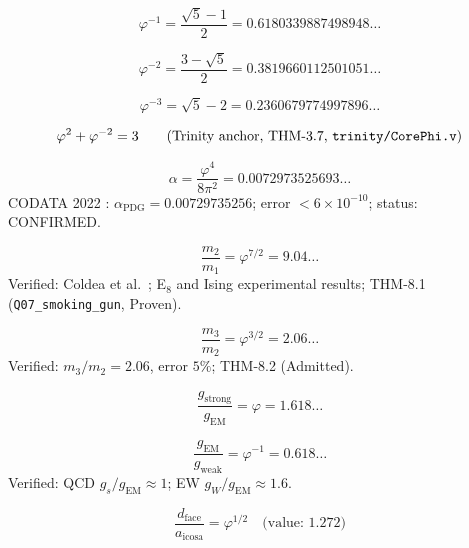 \begin{equation}\label{eq:phi-inv}
\varphi^{-1} = \frac{\sqrt{5}-1}{2} = 0.6180339887498948\ldots
\end{equation}

\begin{equation}\label{eq:phi-inv2}
\varphi^{-2} = \frac{3-\sqrt{5}}{2} = 0.3819660112501051\ldots
\end{equation}

\begin{equation}\label{eq:phi-inv3}
\varphi^{-3} = \sqrt{5}-2 = 0.2360679774997896\ldots
\end{equation}

\begin{equation}\label{eq:trinity}
\varphi^{2}+\varphi^{-2} = 3
\qquad\text{(Trinity anchor, THM-3.7, \texttt{trinity/CorePhi.v})}
\end{equation}

\begin{equation}\label{eq:alpha}
\alpha = \frac{\varphi^{4}}{8\pi^{2}} = 0.0072973525693\ldots
\end{equation}
CODATA 2022 \cite{codata2022}: $\alpha_{\text{PDG}}=0.00729735256$;
error $<6\times 10^{-10}$; status: CONFIRMED.

\begin{equation}\label{eq:m2m1}
\frac{m_{2}}{m_{1}} = \varphi^{7/2} = 9.04\ldots
\end{equation}
Verified: Coldea et al.\ \cite{coldea2010}; E$_8$ and Ising
experimental results; THM-8.1
(\texttt{Q07\_smoking\_gun}, Proven).

\begin{equation}\label{eq:m3m2}
\frac{m_{3}}{m_{2}} = \varphi^{3/2} = 2.06\ldots
\end{equation}
Verified: $m_3/m_2 = 2.06$, error $5\%$; THM-8.2 (Admitted).

\begin{equation}\label{eq:strong-coupling}
\frac{g_{\text{strong}}}{g_{\text{EM}}} = \varphi = 1.618\ldots
\end{equation}

\begin{equation}\label{eq:EM-weak}
\frac{g_{\text{EM}}}{g_{\text{weak}}} = \varphi^{-1} = 0.618\ldots
\end{equation}
Verified: QCD $g_s/g_{\text{EM}}\approx 1$;
EW $g_W/g_{\text{EM}}\approx 1.6$.

\begin{equation}\label{eq:icosa-face}
\frac{d_{\text{face}}}{a_{\text{icosa}}} = \varphi^{1/2}
\quad\text{(value: }1.272\text{)}
\end{equation}

